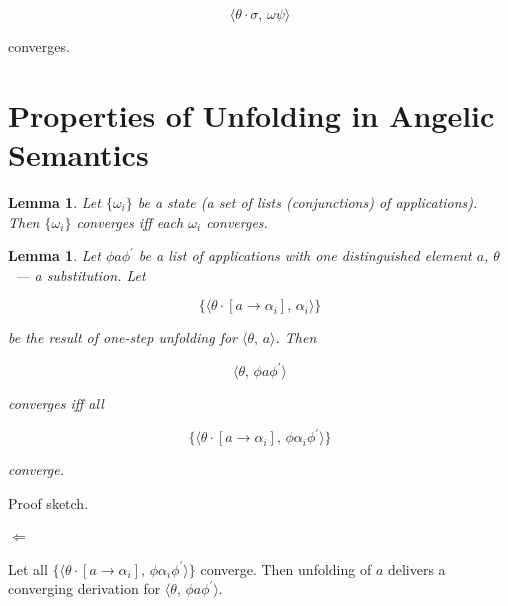 \documentclass{article}[12pt]
\newcommand{\inbr}[1]{\langle #1 \rangle}
\newtheorem{lemma}[theorem]{Lemma}
\begin{document}
\[
\inbr{\theta\cdot\sigma,\,\omega\psi}
\]

converges.

\section{Properties of Unfolding in Angelic Semantics}

\begin{lemma}
  Let $\{\omega_i\}$ be a state (a set of lists (conjunctions) of applications). Then $\{\omega_i\}$ converges iff each $\omega_i$ converges.
\end{lemma}

\begin{lemma}
Let $\phi a \phi^\prime$ be a list of applications with one distinguished element $a$, $\theta$~--- a substitution. Let

\[
\{\inbr{\theta\cdot[a\to\alpha_i],\,\alpha_i}\}
\]

be the result of one-step unfolding for $\inbr{\theta,\,a}$. Then

\[
\inbr{\theta,\,\phi a \phi^\prime}
\]

converges iff all

\[
\{\inbr{\theta\cdot[a\to\alpha_i],\,\phi\alpha_i\phi^\prime}\}
\]

converge.
\end{lemma}

Proof sketch.

\paragraph{$\Leftarrow$} Let all $\{\inbr{\theta\cdot[a\to\alpha_i],\,\phi\alpha_i\phi^\prime}\}$ converge. Then unfolding of $a$ delivers a converging derivation for $\inbr{\theta,\,\phi a \phi^\prime}$.
\end{document}
